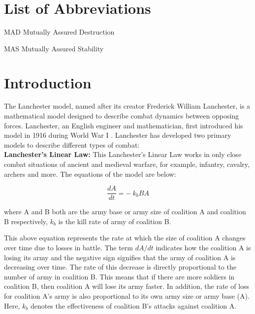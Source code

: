 \documentclass[oneside,12pt]{report}
\begin{document}
\tableofcontents
\listoffigures
\listoftables

\newpage
{}

\chapter*{List of Abbreviations}

\begin{abbrv}
\item[MAD]			Mutually Assured Destruction
\item[MAS]			Mutually Assured Stability
\end{abbrv}

\newpage


\chapter{Introduction}

The Lanchester model, named after its creator Frederick William Lanchester, is a mathematical model designed to describe combat dynamics between opposing forces. Lanchester, an English engineer and mathematician, first introduced his model in 1916 during World War I \cite{r2}. Lanchester has developed two primary models to describe different types of combat:
\\[2em]
\textbf{Lanchester's Linear Law:}
This Lanchester's Linear Law works in only close combat situations of ancient and medieval warfare, for example, infantry, cavalry, archers and more. The equations of the model are below: \cite{r8}

\begin{equation}
\frac{dA}{dt} = -\ k_b B A
\end{equation}

where A and B both are the army base or army size of coalition A and coalition B respectively, \(k_b\) is the kill rate of army of coalition B.

This above equation represents the rate at which the size of coalition A changes over time due to losses in battle. The term \(dA/dt\) indicates how the coalition A is losing its army and the negative sign signifies that the army of coalition A is decreasing over time. The rate of this decrease is directly proportional to the number of army in coalition B. This means that if there are more soldiers in coalition B, then coalition A will lose its army faster. In addition, the rate of loss for coalition A's army is also proportional to its own army size or army base (A). Here, \(k_b\) denotes the effectiveness of coalition B's attacks against coalition A.
\end{document}
